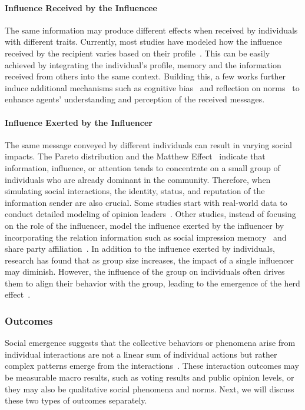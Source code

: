 \paragraph{Influence Received by the Influencee}
The same information may produce different effects when received by individuals with different traits. Currently, most studies have modeled how the influence received by the recipient varies based on their profile~\cite{gao2023s3,liu2024skepticism,yang2024oasis}. This can be easily achieved by integrating the individual's profile, memory and the information received from others into the same context. Building this, a few works further induce additional mechanisms such as cognitive bias~\cite{chuang2023simulating} and reflection on norms~\cite{ren2024emergence} to enhance agents' understanding and perception of the received messages.

\paragraph{Influence Exerted by the Influencer}
The same message conveyed by different individuals can result in varying social impacts. The Pareto distribution and the Matthew Effect~\cite{wang2023recagent,mou2024unveiling} indicate that information, influence, or attention tends to concentrate on a small group of individuals who are already dominant in the community. Therefore, when simulating social interactions, the identity, status, and reputation of the information sender are also crucial. Some studies start with real-world data to conduct detailed modeling of opinion leaders~\cite{xu2024mindechoroleplayinglanguageagents,zhang2024large}. Other studies, instead of focusing on the role of the influencer, model the influence exerted by the influencer by incorporating the relation information such as social impression memory~\cite{yu2024affordable} and share party affiliation~\cite{chuang2024wisdom}. In addition to the influence exerted by individuals, research has found that as group size increases, the impact of a single influencer may diminish. However, the influence of the group on individuals often drives them to align their behavior with the group, leading to the emergence of the herd effect~\cite{yang2024oasis}.


\subsubsection{Outcomes}
Social emergence suggests that the collective behaviors or phenomena arise from individual interactions are not a linear sum of individual actions but rather complex patterns emerge from the interactions~\cite{schelling1971dynamic,squazzoni2014social}. 
These interaction outcomes may be measurable macro results, such as voting results and public opinion levels, or they may also be qualitative social phenomena and norms. Next, we will discuss these two types of outcomes separately.

